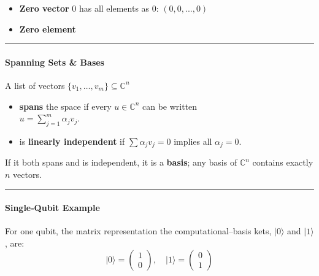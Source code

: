 \begin{itemize}
\item
  \textbf{Zero vector} \(0\) has all elements as 0: \((0, 0, ... , 0)\)
\item
  \textbf{Zero element}
\end{itemize}

\begin{center}\rule{0.5\linewidth}{0.5pt}\end{center}

\hypertarget{spanning-sets-bases}{%
\paragraph{Spanning Sets \& Bases}\label{spanning-sets-bases}}

A list of vectors \(\{v_1,\dots,v_m\}\subseteq\mathbb C^{n}\)

\begin{itemize}
\tightlist
\item
  \textbf{spans} the space if every \(u\in\mathbb C^{n}\) can be
  written\\
  \(u=\sum_{j=1}^{m} \alpha_j v_j\).\\
\item
  is \textbf{linearly independent} if \(\sum\alpha_j v_j = 0\) implies
  all \(\alpha_j=0\).
\end{itemize}

If it both spans and is independent, it is a \textbf{basis}; any basis
of \(\mathbb C^{n}\) contains exactly \(n\) vectors.

\begin{center}\rule{0.5\linewidth}{0.5pt}\end{center}

\hypertarget{singlequbit-example}{%
\paragraph{Single‑Qubit Example}\label{singlequbit-example}}

For one qubit, the matrix representation the computational--basis kets,
\(\lvert0\rangle\) and \(\lvert1\rangle\), are: \[
\lvert0\rangle=\begin{pmatrix}1\\0\end{pmatrix},
\quad
\lvert1\rangle=\begin{pmatrix}0\\1\end{pmatrix}
\]

